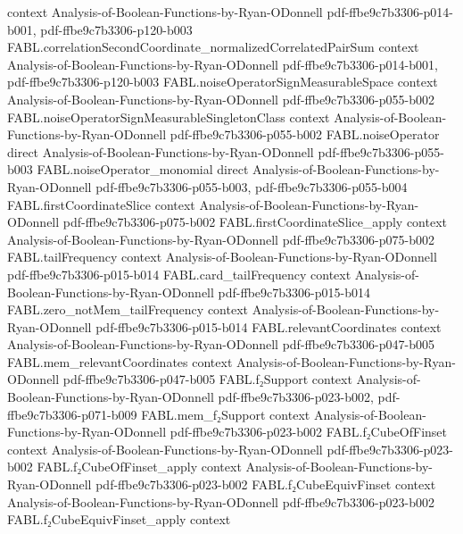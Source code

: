 \begin{theorem}
  {context}
  {Analysis-of-Boolean-Functions-by-Ryan-ODonnell}
  {pdf-ffbe9c7b3306-p014-b001,
    pdf-ffbe9c7b3306-p120-b003}
\proofstep
  {FABL.correlationSecondCoordinate_normalizedCorrelatedPairSum}
  {context}
  {Analysis-of-Boolean-Functions-by-Ryan-ODonnell}
  {pdf-ffbe9c7b3306-p014-b001,
    pdf-ffbe9c7b3306-p120-b003}
\proofstep
  {FABL.noiseOperatorSignMeasurableSpace}
  {context}
  {Analysis-of-Boolean-Functions-by-Ryan-ODonnell}
  {pdf-ffbe9c7b3306-p055-b002}
\proofstep
  {FABL.noiseOperatorSignMeasurableSingletonClass}
  {context}
  {Analysis-of-Boolean-Functions-by-Ryan-ODonnell}
  {pdf-ffbe9c7b3306-p055-b002}
\proofstep
  {FABL.noiseOperator}
  {direct}
  {Analysis-of-Boolean-Functions-by-Ryan-ODonnell}
  {pdf-ffbe9c7b3306-p055-b003}
\proofstep
  {FABL.noiseOperator_monomial}
  {direct}
  {Analysis-of-Boolean-Functions-by-Ryan-ODonnell}
  {pdf-ffbe9c7b3306-p055-b003,
    pdf-ffbe9c7b3306-p055-b004}
\proofstep
  {FABL.firstCoordinateSlice}
  {context}
  {Analysis-of-Boolean-Functions-by-Ryan-ODonnell}
  {pdf-ffbe9c7b3306-p075-b002}
\proofstep
  {FABL.firstCoordinateSlice_apply}
  {context}
  {Analysis-of-Boolean-Functions-by-Ryan-ODonnell}
  {pdf-ffbe9c7b3306-p075-b002}
\proofstep
  {FABL.tailFrequency}
  {context}
  {Analysis-of-Boolean-Functions-by-Ryan-ODonnell}
  {pdf-ffbe9c7b3306-p015-b014}
\proofstep
  {FABL.card_tailFrequency}
  {context}
  {Analysis-of-Boolean-Functions-by-Ryan-ODonnell}
  {pdf-ffbe9c7b3306-p015-b014}
\proofstep
  {FABL.zero_notMem_tailFrequency}
  {context}
  {Analysis-of-Boolean-Functions-by-Ryan-ODonnell}
  {pdf-ffbe9c7b3306-p015-b014}
\proofstep
  {FABL.relevantCoordinates}
  {context}
  {Analysis-of-Boolean-Functions-by-Ryan-ODonnell}
  {pdf-ffbe9c7b3306-p047-b005}
\proofstep
  {FABL.mem_relevantCoordinates}
  {context}
  {Analysis-of-Boolean-Functions-by-Ryan-ODonnell}
  {pdf-ffbe9c7b3306-p047-b005}
\proofstep
  {FABL.f₂Support}
  {context}
  {Analysis-of-Boolean-Functions-by-Ryan-ODonnell}
  {pdf-ffbe9c7b3306-p023-b002,
    pdf-ffbe9c7b3306-p071-b009}
\proofstep
  {FABL.mem_f₂Support}
  {context}
  {Analysis-of-Boolean-Functions-by-Ryan-ODonnell}
  {pdf-ffbe9c7b3306-p023-b002}
\proofstep
  {FABL.f₂CubeOfFinset}
  {context}
  {Analysis-of-Boolean-Functions-by-Ryan-ODonnell}
  {pdf-ffbe9c7b3306-p023-b002}
\proofstep
  {FABL.f₂CubeOfFinset_apply}
  {context}
  {Analysis-of-Boolean-Functions-by-Ryan-ODonnell}
  {pdf-ffbe9c7b3306-p023-b002}
\proofstep
  {FABL.f₂CubeEquivFinset}
  {context}
  {Analysis-of-Boolean-Functions-by-Ryan-ODonnell}
  {pdf-ffbe9c7b3306-p023-b002}
\proofstep
  {FABL.f₂CubeEquivFinset_apply}
  {context}

\end{theorem}

